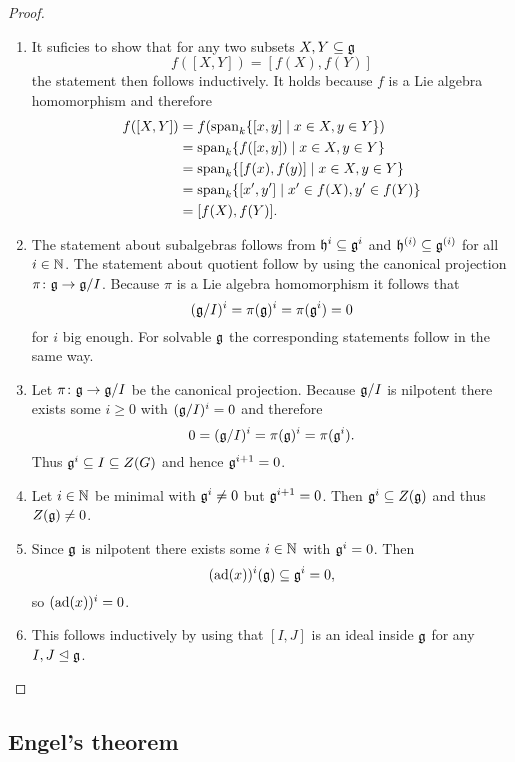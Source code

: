 \begin{proof}
 \begin{enumerate}[leftmargin=*]
  \item
   It suficies to show that for any two subsets $X, Y \subseteq \mathfrak{g}$
   \[
    f([X,Y])= [f(X),f(Y)]
   \]
   the statement then follows inductively. It holds because $f$ is a Lie algebra homomorphism and therefore
   \begin{align*}
    f([X,Y])
    &= f(\operatorname{span}_k \{[x, y] \mid x \in X, y \in Y\}) \\
    &= \operatorname{span}_k \{f([x, y]) \mid x \in X, y \in Y\} \\
    &= \operatorname{span}_k \{[f(x),f(y)] \mid x \in X, y \in Y\} \\
    &= \operatorname{span}_k \{[x',y'] \mid x' \in f(X), y' \in f(Y)\} \\
    &= [f(X),f(Y)].
   \end{align*}
  \item
   The statement about subalgebras follows from $\mathfrak{h}^i \subseteq \mathfrak{g}^i$ and $\mathfrak{h}^{(i)} \subseteq \mathfrak{g}^{(i)}$ for all $i \in \mathbb{N}$. The statement about quotient follow by using the canonical projection $\pi \colon \mathfrak{g} \to \mathfrak{g}/I$. Because $\pi$ is a Lie algebra homomorphism it follows that
   \[
    (\mathfrak{g}/I)^i = \pi(\mathfrak{g})^i = \pi(\mathfrak{g}^i) = 0
   \]
   for $i$ big enough. For solvable $\mathfrak{g}$ the corresponding statements follow in the same way.
  \item
   Let $\pi \colon \mathfrak{g} \to \mathfrak{g}/I$ be the canonical projection. Because $\mathfrak{g}/I$ is nilpotent there exists some $i \geq 0$ with $(\mathfrak{g}/I)^i = 0$ and therefore
   \[
    0 = (\mathfrak{g}/I)^i = \pi(\mathfrak{g})^i = \pi(\mathfrak{g}^i).
   \]
   Thus $\mathfrak{g}^i \subseteq I \subseteq Z(G)$ and hence $\mathfrak{g}^{i+1} = 0$.
  \item
   Let $i \in \mathbb{N}$ be minimal with $\mathfrak{g}^i \neq 0$ but $\mathfrak{g}^{i+1} = 0$. Then $\mathfrak{g}^i \subseteq Z(\mathfrak{g})$ and thus $Z(\mathfrak{g}) \neq 0$.
  \item
   Since $\mathfrak{g}$ is nilpotent there exists some $i \in \mathbb{N}$ with $\mathfrak{g}^i = 0$. Then
   \[
    (\operatorname{ad}(x))^i(\mathfrak{g}) \subseteq \mathfrak{g}^i = 0,
   \]
   so $(\operatorname{ad}(x))^i = 0$.
  \item
   This follows inductively by using that $[I,J]$ is an ideal inside $\mathfrak{g}$ for any $I,J \trianglelefteq \mathfrak{g}$.
 \end{enumerate}
\end{proof}





\subsection{Engel’s theorem}


